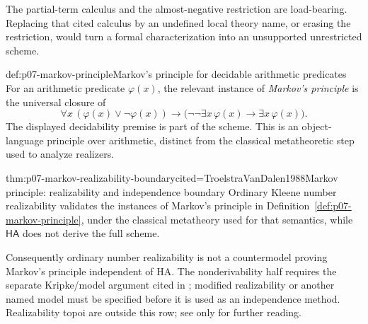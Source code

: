 The partial-term calculus and the almost-negative restriction are
load-bearing.  Replacing that cited calculus by an undefined local theory name,
or erasing the restriction, would turn a formal characterization into an
unsupported unrestricted scheme.

\begin{hbdefinition}{def:p07-markov-principle}{Markov's principle for decidable arithmetic predicates}
For an arithmetic predicate \(\varphi(x)\), the relevant instance of
\emph{Markov's principle} is the universal closure of
\[
 \forall x\,(\varphi(x)\lor\neg\varphi(x))
 \to
 \bigl(\neg\neg\exists x\,\varphi(x)\to\exists x\,\varphi(x)\bigr).
\]
The displayed decidability premise is part of the scheme.  This is an
object-language principle over arithmetic, distinct from the classical
metatheoretic step used to analyze realizers.
\end{hbdefinition}

\begin{hbtheorem}{thm:p07-markov-realizability-boundary}{cited=TroelstraVanDalen1988}{Markov principle: realizability and independence boundary}
Ordinary Kleene number realizability validates the instances of
Markov's principle in Definition~\ref{def:p07-markov-principle}, under the
classical metatheory used for that semantics, while \(\mathsf{HA}\) does not
derive the full scheme.
\end{hbtheorem}

Consequently ordinary number realizability is not a countermodel proving
Markov's principle independent of HA.  The nonderivability half requires the
separate Kripke/model argument cited in
\cite{TroelstraVanDalen1988}; modified realizability or another named model
must be specified before it is used as an independence method.  Realizability
topoi are outside this row; see \cite{VanOosten2008} only for further reading.

